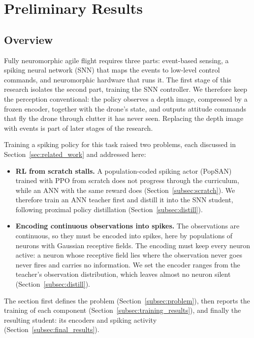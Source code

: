 \section{Preliminary Results}
\label{sec:prelim_results}

\subsection{Overview}
\label{subsec:prelim_overview}
Fully neuromorphic agile flight requires three parts: event-based sensing, a spiking neural network (SNN) that maps the events to low-level control commands, and neuromorphic hardware that runs it. The first stage of this research isolates the second part, training the SNN controller. We therefore keep the perception conventional: the policy observes a depth image, compressed by a frozen encoder, together with the drone's state, and outputs attitude commands that fly the drone through clutter it has never seen. Replacing the depth image with events is part of later stages of the research.

Training a spiking policy for this task raised two problems, each discussed in Section~\ref{sec:related_work} and addressed here:
\begin{itemize}
    \item \textbf{RL from scratch stalls.} A population-coded spiking actor (PopSAN) trained with PPO from scratch does not progress through the curriculum, while an ANN with the same reward does (Section~\ref{subsec:scratch}). We therefore train an ANN teacher first and distill it into the SNN student, following proximal policy distillation (Section~\ref{subsec:distill}).
    \item \textbf{Encoding continuous observations into spikes.} The observations are continuous, so they must be encoded into spikes, here by populations of neurons with Gaussian receptive fields. The encoding must keep every neuron active: a neuron whose receptive field lies where the observation never goes never fires and carries no information. We set the encoder ranges from the teacher's observation distribution, which leaves almost no neuron silent (Section~\ref{subsec:distill}).
\end{itemize}
The section first defines the problem (Section~\ref{subsec:problem}), then reports the training of each component (Section~\ref{subsec:training_results}), and finally the resulting student: its encoders and spiking activity (Section~\ref{subsec:final_results}).




